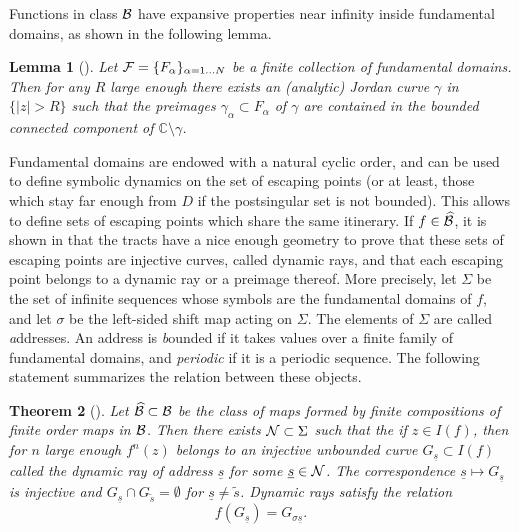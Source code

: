 \documentclass[11pt, twoside]{article}
\newtheorem{thm}{Theorem}[section]
\newtheorem{lem}[thm]{Lemma}
\theoremstyle{definition}
\newcommand{\C}{\mathbb{C}}
\newcommand{\BB}{{\cal B}}
\newcommand{\FF}{{\cal F}}
\newcommand{\NN}{{\cal N}}
\renewcommand{\hat}{\widehat}
\newcommand{\s}{{\underline{s}}}
\renewcommand{\hat}{\widehat}
\newcommand{\BBhat}{\widehat{\BB}}
\begin{document}
Functions in class $\BB$ have expansive properties near infinity inside fundamental domains, as shown in the following lemma.  
 
\begin{lem}[{\cite[Proposition 2.6]{BF15}}]
\label{lem:cutting}Let $\FF=\{F_\alpha\}_{\alpha=1\ldots N}$ be a finite collection of fundamental domains. Then for any $R$ large enough  there exists an (analytic) Jordan curve $\gamma$ in $\{|z| > R\}$ such that    the preimages $\gamma_\alpha\subset F_\alpha$ of $\gamma$ are contained in the bounded connected component of $\C\setminus \gamma$.
 \end{lem}
  

Fundamental domains are endowed with a natural cyclic order, and can be used to define symbolic dynamics on the set of escaping points (or at least, those which stay far enough from  $D$ if the postsingular set is not bounded). This allows to define sets of escaping  points which share the same itinerary. If $f\in \BBhat$, it is shown in \cite{RRRS} that the tracts have a nice enough geometry to prove that these sets of escaping points are injective curves, called dynamic rays, and that each escaping point belongs to a dynamic ray or a preimage thereof. More precisely, let $\Sigma$ be the set of infinite sequences whose symbols are the fundamental domains of $f$,  and let $\sigma$ be the left-sided shift map acting on $\Sigma$. The elements of $\Sigma$ are called {\emph addresses}. An address is {\emph bounded} if it takes values over a finite family of fundamental domains, and \emph{periodic} if it is a periodic sequence.  The following statement summarizes the relation between these objects. 
%


\begin{thm}[\cite{RRRS}]Let $\hat\BB  \subset \BB$ be the class of maps formed by finite compositions of finite order maps in $\BB$.  Then there exists $\NN\subset\Sigma$ such that  the if $z\in I(f)$, then for $n$ large enough $f^n(z)$ belongs to an injective unbounded  curve $G_\s\subset I(f)$ called the \emph{dynamic ray} of address $\s$ for some $\s\in \NN$. The correspondence $\s\mapsto G_\s$ is injective  and $G_\s\cap G_{\tilde{s}}=\emptyset$ for $\s\neq\tilde{s}$. Dynamic rays  satisfy the relation  
\[
f(G_\s)=G_{\sigma\s}.
\]
\end{thm}
\end{document}
